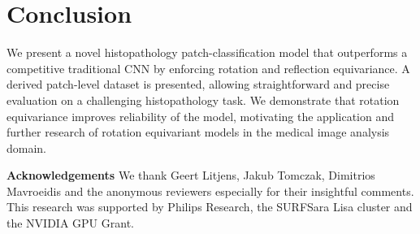\documentclass{llncs}
\begin{document}
\section{Conclusion}
We present a novel histopathology patch-classification model that outperforms a competitive traditional CNN by enforcing rotation and reflection equivariance. A derived patch-level dataset is presented, allowing straightforward and precise evaluation on a challenging histopathology task. We demonstrate that rotation equivariance improves reliability of the model, motivating the application and further research of rotation equivariant models in the medical image analysis domain.
\par\textbf{Acknowledgements}
We thank Geert Litjens, Jakub Tomczak, Dimitrios Mavroeidis and the anonymous reviewers especially for their insightful comments. This research was supported by Philips Research, the SURFSara Lisa cluster and the NVIDIA GPU Grant.














\end{document}
